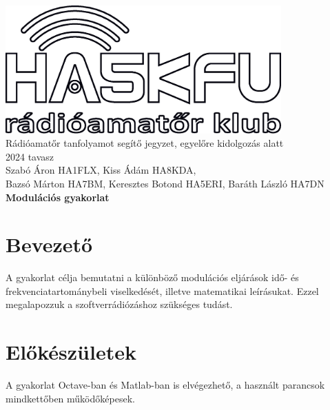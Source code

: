 \documentclass[12pt,a4paper]{article}
\begin{document}
\begin{center}
\includegraphics[width=300pt,keepaspectratio]{figures/ha5kfu.eps}
\\[0.5cm]
Rádióamatőr tanfolyamot segítő jegyzet, egyelőre kidolgozás alatt \\
2024 tavasz \\[0.5cm]
Szabó Áron HA1FLX, Kiss Ádám HA8KDA, \\ Bazsó Márton HA7BM, Keresztes Botond HA5ERI, Baráth László HA7DN%
\\[1cm]

{\huge \bfseries Modulációs gyakorlat \\[0.5cm]}



\end{center}

\renewcommand{\contentsname}{Tartalom}\tableofcontents 
\newpage

\newpage

\section{Bevezető}
A gyakorlat célja bemutatni a különböző modulációs eljárások idő- és frekvenciatartománybeli viselkedését, illetve matematikai leírásukat. Ezzel megalapozzuk a szoftverrádiózáshoz szükséges tudást.

\section{Előkészületek}
A gyakorlat Octave-ban és Matlab-ban is elvégezhető, a használt parancsok mindkettőben működőképesek.
\end{document}
